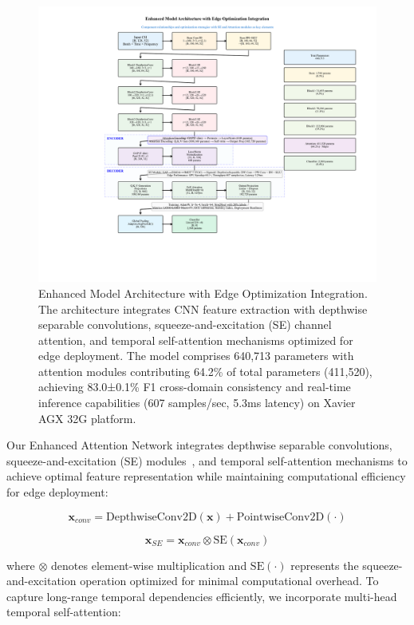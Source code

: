 \documentclass[journal]{IEEEtran}
\begin{document}
\begin{figure}[ht]
\centering
\includegraphics[width=\columnwidth]{plots/fig3_enhanced_model.pdf}
\caption{Enhanced Model Architecture with Edge Optimization Integration. The architecture integrates CNN feature extraction with depthwise separable convolutions, squeeze-and-excitation (SE) channel attention, and temporal self-attention mechanisms optimized for edge deployment. The model comprises 640,713 parameters with attention modules contributing 64.2\% of total parameters (411,520), achieving 83.0±0.1\% F1 cross-domain consistency and real-time inference capabilities (607 samples/sec, 5.3ms latency) on Xavier AGX 32G platform.}
\label{fig:enhanced_3d_arch}
\end{figure}

Our Enhanced Attention Network integrates depthwise separable convolutions, squeeze-and-excitation (SE) modules~\cite{se_networks2018}, and temporal self-attention mechanisms to achieve optimal feature representation while maintaining computational efficiency for edge deployment:

\begin{equation}
\mathbf{x}_{conv} = \text{DepthwiseConv2D}(\mathbf{x}) + \text{PointwiseConv2D}(\cdot)
\end{equation}

\begin{equation}
\mathbf{x}_{SE} = \mathbf{x}_{conv} \otimes \text{SE}(\mathbf{x}_{conv})
\end{equation}

where $\otimes$ denotes element-wise multiplication and $\text{SE}(\cdot)$ represents the squeeze-and-excitation operation optimized for minimal computational overhead. To capture long-range temporal dependencies efficiently, we incorporate multi-head temporal self-attention:
\end{document}
